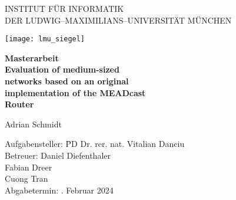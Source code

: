 
\thispagestyle{empty}

\begin{center}

\vspace*{-2cm}

{\Huge INSTITUT FÜR INFORMATIK\\[1mm]}
DER LUDWIG--MAXIMILIANS--UNIVERSITÄT MÜNCHEN\\

\vspace*{1cm}

\texttt{[image: lmu\_siegel]}

\vspace*{2cm}

{\Large \textbf{Masterarbeit}}\\ %

\vspace{2.0cm}
{\Huge \textbf{Evaluation of medium-sized}}\\
\vspace*{3mm}
{\Huge \textbf{networks based on an original}}\\
\vspace*{3mm}
{\Huge \textbf{implementation of the MEADcast}}\\
\vspace*{3mm}
{\Huge \textbf{Router}}\\
\vspace{1.5cm}

{\LARGE Adrian Schmidt} %
\vspace{2cm}

\parbox{1cm}{
\begin{large}
\begin{tabbing}
Aufgabensteller: \hspace{.5cm} \=PD Dr. rer. nat. Vitalian Danciu\\[2mm]
Betreuer:
\>Daniel Diefenthaler\\
\>Fabian Dreer\\ %
\>Cuong Tran\\[5mm]
Abgabetermin: . Februar 2024\\
\end{tabbing}
\end{large}}\\
\vspace{5mm}

\end{center}
